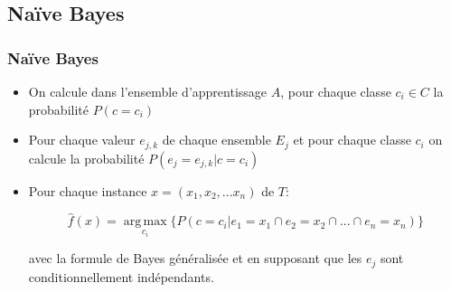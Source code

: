 	\subsection{Naïve Bayes}
	\begin{frame}
	\frametitle{Naïve Bayes}
	\begin{itemize}
	\item On calcule dans l'ensemble d'apprentissage $A$, pour chaque classe $c_{i}\in C$ la probabilité $P(c=c_{i})$
	\item Pour chaque valeur $e_{j,k}$ de chaque ensemble $E_{j}$ et pour chaque classe $c_{i}$ on calcule la probabilité $P(e_{j}=e_{j,k}|c=c_{i})$
	\item Pour chaque instance $x=(x_{1},x_{2},...x_{n})$ de $T$:
	\begin{center}
	\[\hat{f}(x)=\operatorname*{arg\,max}_{c_{i}} \lbrace P(c=c_{i}|e_{1}=x_{1}\cap e_{2}=x_{2}\cap ...\cap e_{n}=x_{n})\rbrace\]
	\end{center}
	avec la formule de Bayes généralisée et en supposant que les $e_{j}$ sont conditionnellement indépendants.
	\end{itemize}
	\end{frame}
